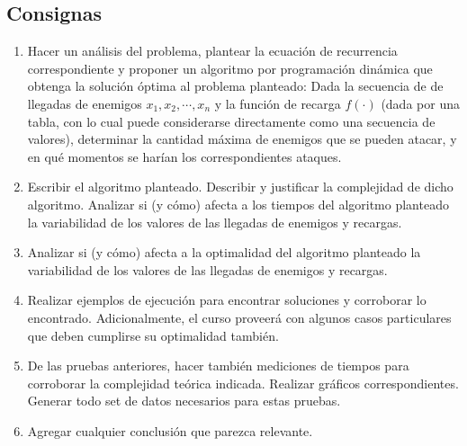 \subsection{Consignas}
\begin{enumerate}
    \item Hacer un análisis del problema, plantear la ecuación de recurrencia correspondiente y proponer un algoritmo por programación dinámica que obtenga la solución óptima al problema planteado: Dada la secuencia de de llegadas de enemigos $x_1, x_2, \cdots, x_n$ y la función de recarga $f(\cdot)$ (dada por una tabla, con lo cual puede considerarse directamente como una secuencia de valores), determinar la cantidad máxima de enemigos que se pueden atacar, y en qué momentos se harían los correspondientes ataques.
    \item Escribir el algoritmo planteado. Describir y justificar la complejidad de dicho algoritmo. Analizar si (y cómo) afecta a los tiempos del algoritmo planteado la variabilidad de los valores de las llegadas de enemigos y recargas.
    \item Analizar si (y cómo) afecta a la optimalidad del algoritmo planteado la variabilidad de los valores de las llegadas de enemigos y recargas.
    \item Realizar ejemplos de ejecución para encontrar soluciones y corroborar lo encontrado. Adicionalmente, el curso proveerá con algunos casos particulares que deben cumplirse su optimalidad también.
    \item De las pruebas anteriores, hacer también mediciones de tiempos para corroborar la complejidad teórica indicada. Realizar gráficos correspondientes. Generar todo set de datos necesarios para estas pruebas.
    \item Agregar cualquier conclusión que parezca relevante.

\end{enumerate}